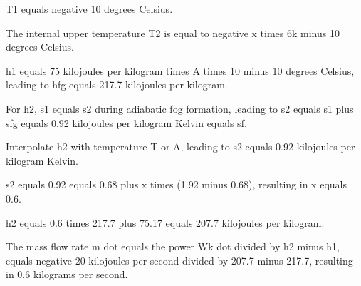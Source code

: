 T1 equals negative 10 degrees Celsius.

The internal upper temperature T2 is equal to negative x times 6k minus 10 degrees Celsius.

h1 equals 75 kilojoules per kilogram times A times 10 minus 10 degrees Celsius, leading to hfg equals 217.7 kilojoules per kilogram.

For h2, s1 equals s2 during adiabatic fog formation, leading to s2 equals s1 plus sfg equals 0.92 kilojoules per kilogram Kelvin equals sf.

Interpolate h2 with temperature T or A, leading to s2 equals 0.92 kilojoules per kilogram Kelvin.

s2 equals 0.92 equals 0.68 plus x times (1.92 minus 0.68), resulting in x equals 0.6.

h2 equals 0.6 times 217.7 plus 75.17 equals 207.7 kilojoules per kilogram.

The mass flow rate m dot equals the power Wk dot divided by h2 minus h1, equals negative 20 kilojoules per second divided by 207.7 minus 217.7, resulting in 0.6 kilograms per second.